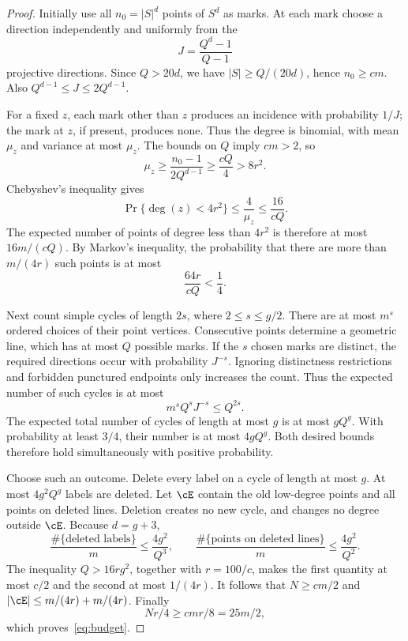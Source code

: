 \begin{proof}
Initially use all \(n_0=|S|^d\) points of \(S^d\) as marks. At each
mark choose a direction independently and uniformly from the
\[
 J=\frac{Q^d-1}{Q-1}
\]
projective directions. Since \(Q>20d\), we have
\(|S|\ge Q/(20d)\), hence \(n_0\ge cm\).
Also \(Q^{d-1}\le J\le2Q^{d-1}\).

For a fixed \(z\), each mark other than \(z\) produces an incidence
with probability \(1/J\); the mark at \(z\), if present, produces none.
Thus the degree is binomial, with mean \(\mu_z\) and variance at most
\(\mu_z\). The bounds on \(Q\) imply \(cm>2\), so
\[
 \mu_z\ge\frac{n_0-1}{2Q^{d-1}}
 \ge\frac{cQ}{4}>8r^2.
\]
Chebyshev's inequality gives
\[
 \Pr\{\deg(z)<4r^2\}\le\frac{4}{\mu_z}
 \le\frac{16}{cQ}.
\]
The expected number of points of degree less than \(4r^2\) is therefore
at most \(16m/(cQ)\). By Markov's inequality, the probability that
there are more than \(m/(4r)\) such points is at most
\[
 \frac{64r}{cQ}<\frac14.
\]

Next count simple cycles of length \(2s\), where \(2\le s\le g/2\).
There are at most \(m^s\) ordered choices of their point vertices.
Consecutive points determine a geometric line, which has at most \(Q\)
possible marks. If the \(s\) chosen marks are distinct, the required
directions occur with probability \(J^{-s}\).
Ignoring distinctness restrictions and forbidden punctured endpoints
only increases the count. Thus the expected number of such cycles is
at most
\[
 m^s Q^sJ^{-s}\le Q^{2s}.
\]
The expected total number of cycles of length at most \(g\) is at most
\(gQ^g\). With probability at least \(3/4\), their number is at most
\(4gQ^g\). Both desired bounds therefore hold simultaneously with
positive probability.

Choose such an outcome. Delete every label on a cycle of length at
most \(g\). At most \(4g^2Q^g\) labels are deleted. Let \(\cE\)
contain the old low-degree points and all points on deleted lines.
Deletion creates no new cycle, and changes no degree outside \(\cE\).
Because \(d=g+3\),
\[
 \frac{\#\{\text{deleted labels}\}}m\le\frac{4g^2}{Q^3},
 \qquad
 \frac{\#\{\text{points on deleted lines}\}}m
 \le\frac{4g^2}{Q^2}.
\]
The inequality \(Q>16rg^2\), together with \(r=100/c\), makes the first
quantity at most \(c/2\) and the second at most \(1/(4r)\).
It follows that \(N\ge cm/2\) and
\(|\cE|\le m/(4r)+m/(4r)\). Finally
\[
 Nr/4\ge cmr/8=25m/2,
\]
which proves~\eqref{eq:budget}.
\end{proof}

